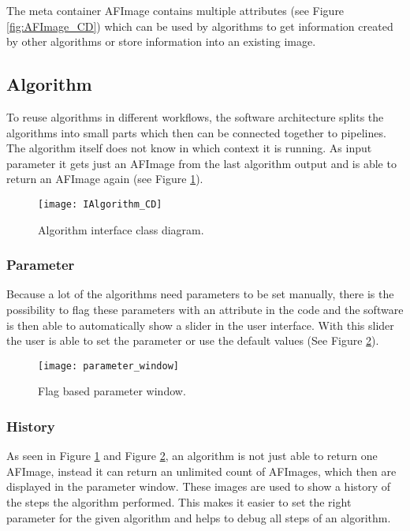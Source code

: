The meta container AFImage contains multiple attributes (see Figure \ref{fig:AFImage_CD}) which can be used by algorithms to get information created by other algorithms or store information into an existing image.

\subsection{Algorithm}
To reuse algorithms in different workflows, the software architecture splits the algorithms into small parts which then can be connected together to pipelines. The algorithm itself does not know in which context it is running. As input parameter it gets just an AFImage from the last algorithm output and is able to return an AFImage again (see Figure \ref{fig:IAlgorithm_CD}). 

\begin{figure}[h]
  \centering
      \texttt{[image: IAlgorithm\_CD]}
  \caption{Algorithm interface class diagram.}
  \label{fig:IAlgorithm_CD}
\end{figure}

\subsubsection{Parameter}
Because a lot of the algorithms need parameters to be set manually, there is the possibility to flag these parameters with an attribute in the code and the software is then able to automatically show a slider in the user interface. With this slider the user is able to set the parameter or use the default values (See Figure \ref{fig:parameter_window}).


\begin{figure}[h]
  \centering
      \texttt{[image: parameter\_window]}
  \caption{Flag based parameter window.}
  \label{fig:parameter_window}
\end{figure}

\subsubsection{History}
As seen in Figure \ref{fig:IAlgorithm_CD} and Figure \ref{fig:parameter_window}, an algorithm is not just able to return one AFImage, instead it can return an unlimited count of AFImages, which then are displayed in the parameter window. These images are used to show a history of the steps the algorithm performed. This makes it easier to set the right parameter for the given algorithm and helps to debug all steps of an algorithm.

